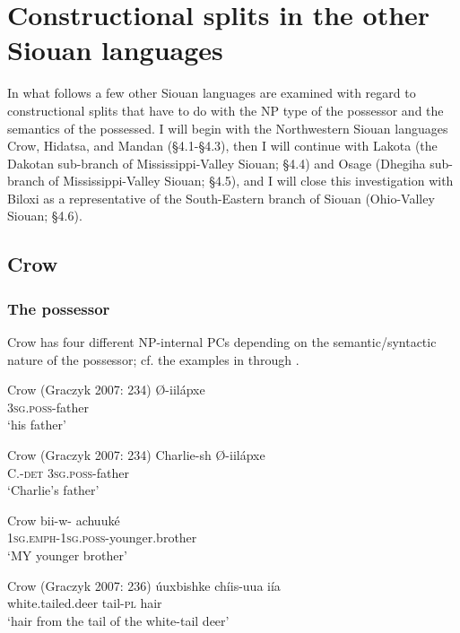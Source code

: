 \documentclass[output=paper]{LSP/langsci}
\begin{document}
\section{Constructional splits in the other Siouan languages}

In what follows a few other Siouan languages are examined with regard to constructional splits that have to do with the NP type of the possessor and the semantics of the possessed. I will begin with the Northwestern Siouan languages Crow, Hidatsa, and Mandan (§4.1-§4.3), then I will continue with Lakota (the Dakotan sub-branch of Mississippi-Valley Siouan; §4.4) and Osage (Dhegiha sub-branch of Mississippi-Valley Siouan; §4.5), and I will close this investigation with Biloxi as a representative of the South-Eastern branch of Siouan (Ohio-Valley Siouan; §4.6).

\subsection{Crow}
\subsubsection{The possessor}
Crow has four different NP-internal PCs depending on the semantic/syntactic nature of the possessor; cf. the examples in  through . 

\ea Crow (Graczyk 2007: 234) \label{crowfather}
\ex
\gll Ø-iilápxe \\
\textsc{3sg.poss}-father \\
\glt `his father'
\z
\z

\ea Crow (Graczyk 2007: 234) \label{crowcharlie}
\ex
\gll Charlie-sh 		Ø-iilápxe \\
C.-\textsc{det}      \textsc{3sg.poss}-father \\
\glt `Charlie's father'
\z \z

\ea	Crow \citep[235]{Graczyk2007} \label{crowbrother}
\ex 
\gll bii-w- achuuké \\
\textsc{1sg.emph-1sg.poss}-younger.brother \\
\glt `MY younger brother'
\z \z

\ea Crow (Graczyk 2007: 236) \label{crowdeer}
\ex 
\gll úuxbishke            chíis-uua iía \\
white.tailed.deer tail-\textsc{pl}      hair \\
\glt `hair from the tail of the white-tail deer'
\z \z
\end{document}
